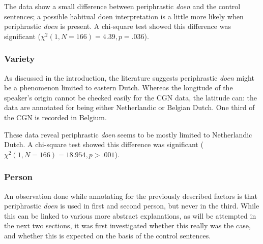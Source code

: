 \documentclass[12pt]{article}
\begin{document}
The data show a small difference between periphrastic \emph{doen} and the control sentences; a possible habitual doen interpretation is a little more likely when periphrastic \emph{doen} is present. A chi-square test showed this difference was significant ($\chi^2(1, N=166) = 4.39, p = .036$).

\subsubsection{Variety}

As discussed in the introduction, the literature suggests periphrastic \emph{doen} might be a phenomenon limited to eastern Dutch. Whereas the longitude of the speaker's origin cannot be checked easily for the CGN data, the latitude can: the data are annotated for being either Netherlandic or Belgian Dutch. One third of the CGN is recorded in Belgium.

\begin{table}[h] \footnotesize

\caption{\footnotesize Distribution of variety for the \emph{doen} sentences and the control sentences.}
\end{table}

These data reveal periphrastic \emph{doen} seems to be mostly limited to Netherlandic Dutch. A chi-square test showed this difference was significant ($\chi^2(1, N=166) = 18.954, p > .001$).

\subsubsection{Person}

An observation done while annotating for the previously described factors is that periphrastic \emph{doen} is used in first and second person, but never in the third. While this can be linked to various more abstract explanations, as will be attempted in the next two sections, it was first investigated whether this really was the case, and whether this is expected on the basis of the control sentences.
\end{document}
